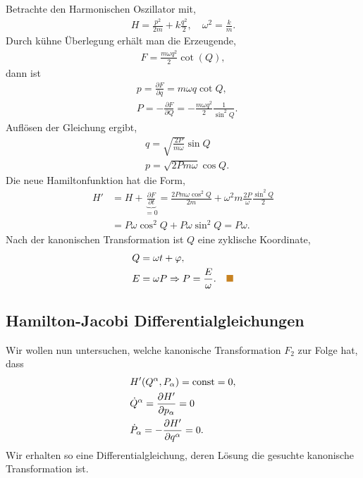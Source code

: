 \begin{bsp}
Betrachte den Harmonischen Oszillator mit,
\begin{align*}
H=\frac{p^2}{2m} + k\frac{q^2}{2},\quad \omega^2=\frac{k}{m}.
\end{align*}
Durch kühne Überlegung erhält man die Erzeugende,
\begin{align*}
F = \frac{m\omega q^2}{2}\cot(Q),
\end{align*}
dann ist
\begin{align*}
&p = \frac{\partial F}{\partial q} = m\omega q \cot Q,\\
&P = -\frac{\partial F}{\partial Q} = -\frac{m\omega q^2}{2}\frac{1}{\sin^2 Q}.
\end{align*}
Auflösen der Gleichung ergibt,
\begin{align*}
&q = \sqrt{\frac{2P}{m\omega}}\sin Q\\
&p = \sqrt{2Pm\omega}\cos Q.
\end{align*}
Die neue Hamiltonfunktion hat die Form,
\begin{align*}
H' &= H + \underbrace{\frac{\partial F}{\partial t}}_{=0}
= \frac{2 Pm\omega \cos^2 Q}{2m} + \omega^2 m\frac{2P}{\omega}\frac{\sin^2
Q}{2}\\ &= P\omega \cos^2 Q + P\omega \sin^2 Q = P\omega.
\end{align*}
Nach der kanonischen Transformation ist $Q$ eine zyklische Koordinate,
\begin{align*}
&Q = \omega t + \ph,\\
&E = \omega P \Rightarrow P = \frac{E}{\omega}.\bsphere
\end{align*}
\end{bsp}

\subsection{Hamilton-Jacobi Differentialgleichungen}

Wir wollen nun untersuchen, welche kanonische Transformation $F_2$ zur Folge
hat, dass
\begin{align*}
&H'(Q^\alpha, P_\alpha) = \mathrm{const} = 0,\\
&\dot{Q}^\alpha = \frac{\partial H'}{\partial p_\alpha} = 0\\
&\dot{P}_\alpha = -\frac{\partial H'}{\partial q^\alpha} = 0.
\end{align*}
Wir erhalten so eine Differentialgleichung, deren Lösung die gesuchte kanonische
Transformation ist.

